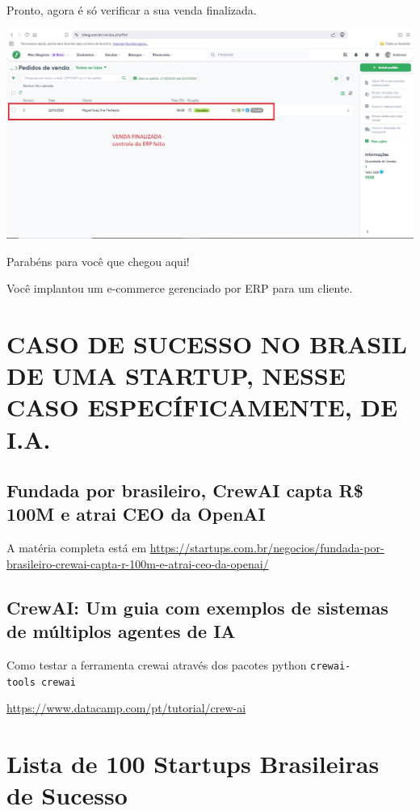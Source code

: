 \documentclass[
]{book}
\begin{document}
Pronto, agora é só verificar a sua venda finalizada.

\includegraphics{images/np1/115-ERP_liberar_venda7.jpg}

Parabéns para você que chegou aqui!

Você implantou um e-commerce gerenciado por ERP para um cliente.

\section{CASO DE SUCESSO NO BRASIL DE UMA STARTUP, NESSE CASO ESPECÍFICAMENTE, DE I.A.}\label{caso-de-sucesso-no-brasil-de-uma-startup-nesse-caso-especuxedficamente-de-i.a.}

\subsection{Fundada por brasileiro, CrewAI capta R\$ 100M e atrai CEO da OpenAI}\label{fundada-por-brasileiro-crewai-capta-r-100m-e-atrai-ceo-da-openai}

A matéria completa está em \url{https://startups.com.br/negocios/fundada-por-brasileiro-crewai-capta-r-100m-e-atrai-ceo-da-openai/}

\subsection{CrewAI: Um guia com exemplos de sistemas de múltiplos agentes de IA}\label{crewai-um-guia-com-exemplos-de-sistemas-de-muxfaltiplos-agentes-de-ia}

Como testar a ferramenta crewai através dos pacotes python \texttt{crewai-tools\ crewai}

\url{https://www.datacamp.com/pt/tutorial/crew-ai}

\section{Lista de 100 Startups Brasileiras de Sucesso}\label{lista-de-100-startups-brasileiras-de-sucesso}
\end{document}
